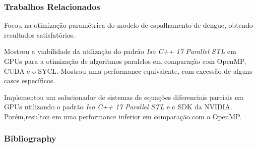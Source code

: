 \documentclass[brazil, bsc, 10pt]{beamer}
\begin{document}
\begin{frame}
	\frametitle{Trabalhos Relacionados}
	\begin{block}{}
		Focou na otimização paramétrica do modelo de espalhamento de dengue, obtendo resultados satisfatórios.
	\end{block}

	\begin{block}{}
		Mostrou a viabilidade da utilização do padrão \textit{Iso C++ 17 Parallel STL} em GPUs para a otimização de algoritmos paralelos em comparação com OpenMP, CUDA e o SYCL. Mostrou uma performance equivalente, com excessão de alguns casos específicos.
	\end{block}

	\begin{block}{}
		Implementou um solucionador de sistemas de equações diferenciais parciais em GPUs utilizando o padrão \textit{Iso C++ 17 Parallel STL} e o SDK da NVIDIA. Porém,resultou em uma performance inferior em comparação com o OpenMP.
	\end{block}
\end{frame}


\begin{frame}[allowframebreaks]
	\frametitle{Bibliography}
	
\end{frame}
\end{document}
